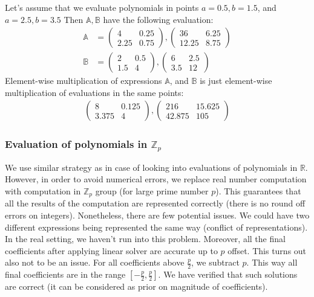 Let's assume that we evaluate polynomials in points $a = 0.5, b = 1.5$, and $a = 2.5, b = 3.5$
Then $\mathbb{A}, \mathbb{B}$ have the following evaluation:
\begin{align*}
\mathbb{A} &= \begin{pmatrix} 4 & 0.25\\ 2.25 & 0.75 \end{pmatrix}, \begin{pmatrix} 36 & 6.25\\ 12.25 & 8.75 \end{pmatrix} \\
\mathbb{B} &= \begin{pmatrix} 2 & 0.5\\ 1.5 & 4 \end{pmatrix}, \begin{pmatrix} 6 & 2.5\\ 3.5 & 12 \end{pmatrix}
\end{align*}
Element-wise multiplication of expressions $\mathbb{A}$, and $\mathbb{B}$ is just element-wise multiplication of evaluations
in the same points:
\begin{align*}
\begin{pmatrix} 8 & 0.125\\ 3.375 & 4 \end{pmatrix}, \begin{pmatrix} 216 & 15.625\\ 42.875 & 105 \end{pmatrix}
\end{align*}

\subsubsection{Evaluation of polynomials in $\mathbb{Z}_p$}
We use similar strategy as in case of looking into evaluations of polynomials in $\mathbb{R}$. However, in order
to avoid numerical errors, we replace real number computation with computation in $\mathbb{Z}_p$ group (for large prime number $p$). This
guarantees that all the results of the computation are represented correctly (there is no round off errors on integers). Nonetheless, there are few potential
issues. We could have two different expressions being represented the same way (conflict of representations). In the
real setting, we haven't run into this problem. Moreover, all the final coefficients after applying linear solver are
accurate up to $p$ offset. This turns out also not to be an issue. For all coefficients above $\frac{p}{2}$, we subtract $p$. 
This way all final coefficients are in the range $[-\frac{p}{2}, \frac{p}{2}]$. We have verified that such solutions are correct
(it can be considered as prior on magnitude of coefficients). 

